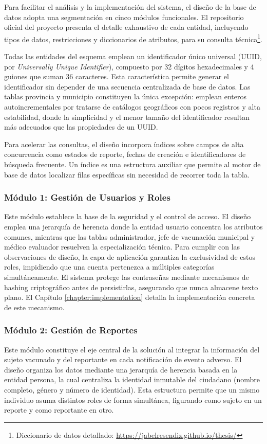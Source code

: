 Para facilitar el análisis y la implementación del sistema, el diseño de la base de datos adopta una segmentación en cinco módulos funcionales. 
El repositorio oficial del proyecto presenta el detalle exhaustivo de cada entidad, incluyendo tipos de datos, restricciones y diccionarios de atributos, para su consulta técnica\footnote{Diccionario de datos detallado: \url{https://jabelresendiz.github.io/thesis/}}.

Todas las entidades del esquema emplean un identificador único universal (UUID, por \textit{Universally Unique Identifier}), compuesto por 32 dígitos hexadecimales y 4 guiones que suman 36 caracteres.
Esta característica permite generar el identificador sin depender de una secuencia centralizada de base de datos. 
Las tablas provincia y municipio constituyen la única excepción: emplean enteros autoincrementales por tratarse de catálogos geográficos con pocos registros y alta estabilidad, donde la simplicidad y el menor tamaño del identificador resultan más adecuados que las propiedades de un UUID.

Para acelerar las consultas, el diseño incorpora índices sobre campos de alta concurrencia como estados de reporte, fechas de creación e identificadores de búsqueda frecuente. 
Un índice es una estructura auxiliar que permite al motor de base de datos localizar filas específicas sin necesidad de recorrer toda la tabla.

\subsubsection{Módulo 1: Gestión de Usuarios y Roles}
Este módulo establece la base de la seguridad y el control de acceso. 
El diseño emplea una jerarquía de herencia donde la entidad usuario concentra los atributos comunes, mientras que las tablas administrador, jefe de vacunación municipal y médico evaluador resuelven la especialización técnica. 
Para cumplir con las observaciones de diseño, la capa de aplicación garantiza la exclusividad de estos roles, impidiendo que una cuenta pertenezca a múltiples categorías simultáneamente. 
El sistema protege las contraseñas mediante mecanismos de hashing criptográfico antes de persistirlas, asegurando que nunca almacene texto plano.
El Capítulo \ref{chapter:implementation} detalla la implementación concreta de este mecanismo.

\subsubsection{Módulo 2: Gestión de Reportes}
Este módulo constituye el eje central de la solución al integrar la información del sujeto vacunado y del reportante en cada notificación de evento adverso. 
El diseño organiza los datos mediante una jerarquía de herencia basada en la entidad persona, la cual centraliza la identidad inmutable del ciudadano (nombre completo, género y número de identidad). 
Esta estructura permite que un mismo individuo asuma distintos roles de forma simultánea, figurando como sujeto en un reporte y como reportante en otro.

